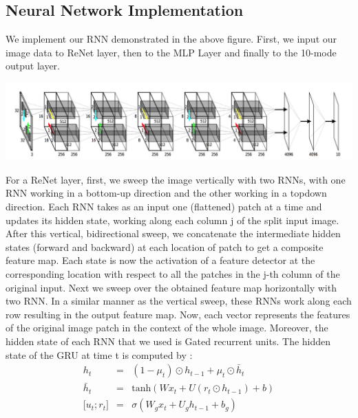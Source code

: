 \documentclass[final,leqno]{siamltex}
\begin{document}
\subsection{Neural Network Implementation}
We implement our RNN demonstrated in the above figure. First, we input our image data to ReNet layer, then to the MLP Layer and finally to the 10-mode output layer. \\
\begin{center}
\includegraphics[scale=0.25]{Figures/renet_network}\\
\end{center}
For a ReNet layer, first, we sweep the image vertically with two RNNs, with one RNN working in a bottom-up direction and the other working in a topdown direction. Each RNN takes as an input one (flattened) patch at a time and updates its hidden state, working along each column j of the split input image. After this vertical, bidirectional sweep, we concatenate the intermediate hidden states (forward and backward) at each location of patch to get a composite feature map. Each state is now the activation of a feature detector at the corresponding location with respect to all the patches in the j-th column of the original input. Next we sweep over the obtained feature map horizontally with two RNN. In a similar manner as the vertical sweep, these RNNs work along each row resulting in the output feature map. Now, each vector represents the features of the original image patch in the context of the whole image. Moreover, the hidden state of each RNN that we used is Gated recurrent units. The hidden state of the GRU at time t is computed by \cite{DBLP:journals/corr/ChoMGBSB14}:
\begin{eqnarray*}
	h_t &=& (1-\mu_t)\odot h_{t-1}+\mu_t\odot \bar h_t\\
	\bar h_t &=& \text{tanh} (Wx_t+U(r_t \odot h_{t-1})+b)\\
	\lbrack u_t;r_t \rbrack &=& \sigma(W_g x_t+U_g h_{t-1}+b_g)
\end{eqnarray*}
\end{document}
